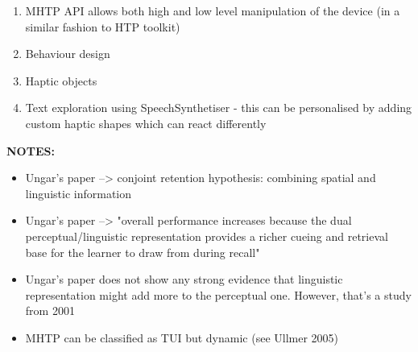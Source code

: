 \begin{enumerate}
\begin{enumerate}
        \end{enumerate}
    \item MHTP API allows both high and low level manipulation of the device (in a similar fashion to HTP toolkit)
    \item Behaviour design
    \item Haptic objects
    \item Text exploration using SpeechSynthetiser - this can be personalised by adding custom haptic shapes which can react differently
\end{enumerate}


\textbf{NOTES:}

\begin{itemize}
    \item Ungar's paper --> conjoint retention hypothesis: combining spatial and linguistic information
    \item Ungar's paper --> "overall performance increases because the dual perceptual/linguistic representation provides a richer cueing and retrieval base for the learner to draw from during recall"
    \item Ungar's paper does not show any strong evidence that linguistic representation might add more to the perceptual one. However, that's a study from 2001
    \item MHTP can be classified as TUI but dynamic (see Ullmer 2005)
\end{itemize}

